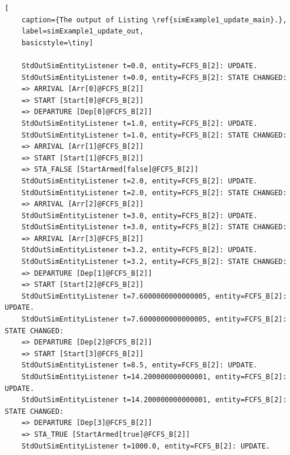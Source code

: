 \begin{lstfloat}
	\begin{lstlisting}[
	caption={The output of Listing \ref{simExample1_update_main}.},
	label=simExample1_update_out,
	basicstyle=\tiny]
	
	StdOutSimEntityListener t=0.0, entity=FCFS_B[2]: UPDATE.
	StdOutSimEntityListener t=0.0, entity=FCFS_B[2]: STATE CHANGED:
	=> ARRIVAL [Arr[0]@FCFS_B[2]]
	=> START [Start[0]@FCFS_B[2]]
	=> DEPARTURE [Dep[0]@FCFS_B[2]]
	StdOutSimEntityListener t=1.0, entity=FCFS_B[2]: UPDATE.
	StdOutSimEntityListener t=1.0, entity=FCFS_B[2]: STATE CHANGED:
	=> ARRIVAL [Arr[1]@FCFS_B[2]]
	=> START [Start[1]@FCFS_B[2]]
	=> STA_FALSE [StartArmed[false]@FCFS_B[2]]
	StdOutSimEntityListener t=2.0, entity=FCFS_B[2]: UPDATE.
	StdOutSimEntityListener t=2.0, entity=FCFS_B[2]: STATE CHANGED:
	=> ARRIVAL [Arr[2]@FCFS_B[2]]
	StdOutSimEntityListener t=3.0, entity=FCFS_B[2]: UPDATE.
	StdOutSimEntityListener t=3.0, entity=FCFS_B[2]: STATE CHANGED:
	=> ARRIVAL [Arr[3]@FCFS_B[2]]
	StdOutSimEntityListener t=3.2, entity=FCFS_B[2]: UPDATE.
	StdOutSimEntityListener t=3.2, entity=FCFS_B[2]: STATE CHANGED:
	=> DEPARTURE [Dep[1]@FCFS_B[2]]
	=> START [Start[2]@FCFS_B[2]]
	StdOutSimEntityListener t=7.6000000000000005, entity=FCFS_B[2]: UPDATE.
	StdOutSimEntityListener t=7.6000000000000005, entity=FCFS_B[2]: STATE CHANGED:
	=> DEPARTURE [Dep[2]@FCFS_B[2]]
	=> START [Start[3]@FCFS_B[2]]
	StdOutSimEntityListener t=8.5, entity=FCFS_B[2]: UPDATE.
	StdOutSimEntityListener t=14.200000000000001, entity=FCFS_B[2]: UPDATE.
	StdOutSimEntityListener t=14.200000000000001, entity=FCFS_B[2]: STATE CHANGED:
	=> DEPARTURE [Dep[3]@FCFS_B[2]]
	=> STA_TRUE [StartArmed[true]@FCFS_B[2]]
	StdOutSimEntityListener t=1000.0, entity=FCFS_B[2]: UPDATE.
	
	\end{lstlisting}
\end{lstfloat}

